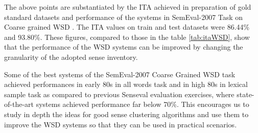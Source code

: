 The above points are substantiated by the ITA achieved in preparation of gold standard datasets and performance of the systems in SemEval-2007 Task on Coarse grained WSD \citep{navigli-litkowski:SemEval-2007}. The ITA values on train and test datasets were 86.44\% and 93.80\%. These figures, compared to those in the table \ref{tab:itaWSD}, show that the performance of the WSD systems can be improved by changing the granularity of the adopted sense inventory.

Some of the best systems of the SemEval-2007 Coarse Grained WSD task achieved performances in early 80s in all words task and in high 80s in lexical sample task as compared to previous Senseval evaluation exercises, where state-of-the-art systems achieved performance far below 70\%. This encourages us to study in depth the ideas for good sense clustering algorithms and use them to improve the WSD systems so that they can be used in practical scenarios.

\begin{comment}
To understand the granularity of WordNet, lets take an example.
\begin{example}
Consider the senses of the word \textit{evidence} as a \textit{noun} from WordNet version 3.1\footnote{Online WordNet Search : \url{http://wordnetweb.princeton.edu/perl/webwn}} in the table \ref{tab:evidenceExample}.
For most of the applications the sense distinctions are too-fine and are not required. 
One might say that they are all clearly related. \cite{mccarthy2006relating}
\begin{table}[h]
\centering
\begin{tabular}{ | l | p{12cm} |} 
\hline
WordNet Sense & Gloss \\ \hline
evidence\#n\#1 & evidence, grounds (your basis for belief or disbelief; knowledge on which to base belief)  ``the evidence that smoking causes lung cancer is very compelling`` \\ \hline
evidence\#n\#2 & evidence (an indication that makes something evident) ''his trembling was evidence of his fear'' \\ \hline
evidence\#n\#3 & evidence ((law) all the means by which any alleged matter of fact whose truth is investigated at judicial trial is established or disproved) \\ \hline    
\end{tabular}
\caption{Senses of the word \textit{evidence}} 
\label{tab:evidenceExample}
\end{table}
\end{example}
\end{comment}

